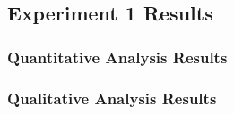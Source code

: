 \subsection{Experiment 1 Results} \label{results-1}
\subsubsection{Quantitative Analysis Results}

    
    
    
    
    
    
\subsubsection{Qualitative Analysis Results}